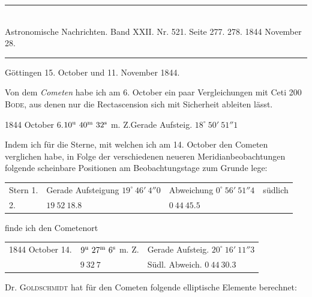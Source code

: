 \clearpage
{}
\hypertarget{native-474-lower}{}
\begin{center}
\rule{0.55\linewidth}{0.4pt}\\[2pt]
Astronomische Nachrichten. Band XXII. Nr. 521. Seite 277. 278. 1844 November 28.\\[2pt]
\rule{0.55\linewidth}{0.4pt}
\end{center}
\begin{flushright}Göttingen 15. October und 11. November 1844.\end{flushright}

Von dem \emph{Cometen} habe ich am 6. October ein paar Vergleichungen mit Ceti 200 \textsc{Bode}, aus denen nur die Rectascension sich mit Sicherheit ableiten lässt.

\begin{center}
1844 October 6.\quad $10^{\rm u}\ 40^{\rm m}\ 32^{\rm s}$ m. Z.\quad Gerade Aufsteig. $18^\circ\ 50'\ 51''1$
\end{center}

Indem ich für die Sterne, mit welchen ich am 14. October den Cometen verglichen habe, in Folge der verschiedenen neueren Meridianbeobachtungen folgende scheinbare Positionen am Beobachtungstage zum Grunde lege:

\begin{center}
\setlength{\tabcolsep}{3pt}
\begin{tabular}{llll}
Stern 1. & \shortstack[l]{Gerade Aufsteigung\\$19^\circ\ 46'\ 4''0$} & \shortstack[l]{Abweichung\\$0^\circ\ 56'\ 51''4$} & südlich \\
\hfill 2. & \hfill $19\ 52\ 18.8$ & \hfill $0\ 44\ 45.5$ & \\
\end{tabular}
\end{center}
\noindent finde ich den Cometenort

\begin{center}
\setlength{\tabcolsep}{3pt}
\begin{tabular}{lll}
1844 October 14. & $9^{\rm u}\ 27^{\rm m}\ 6^{\rm s}$ m. Z. & Gerade Aufsteig. $20^\circ\ 16'\ 11''3$ \\
 & $9\ 32\ 7$ & Südl. Abweich. $0\ 44\ 30.3$ \\
\end{tabular}
\end{center}

Dr. \textsc{Goldschmidt} hat für den Cometen folgende elliptische Elemente berechnet:

